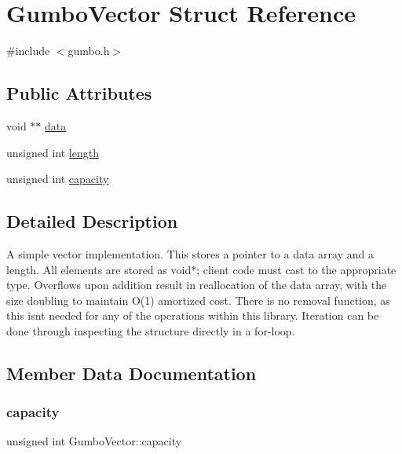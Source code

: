 \hypertarget{struct_gumbo_vector}{}\section{Gumbo\+Vector Struct Reference}
\label{struct_gumbo_vector}


{\ttfamily \#include $<$gumbo.\+h$>$}

\subsection*{Public Attributes}
\begin{DoxyCompactItemize}
\item 
void $\ast$$\ast$ \mbox{\hyperlink{struct_gumbo_vector_a161ea3bf7f915fae8350edded5149a92}{data}}
\item 
unsigned int \mbox{\hyperlink{struct_gumbo_vector_abc3aae0896f142d245cfe29c94dbdf66}{length}}
\item 
unsigned int \mbox{\hyperlink{struct_gumbo_vector_a84033dd4f32fba2013aff52baeba6356}{capacity}}
\end{DoxyCompactItemize}


\subsection{Detailed Description}
A simple vector implementation. This stores a pointer to a data array and a length. All elements are stored as void$\ast$; client code must cast to the appropriate type. Overflows upon addition result in reallocation of the data array, with the size doubling to maintain O(1) amortized cost. There is no removal function, as this isn\textquotesingle{}t needed for any of the operations within this library. Iteration can be done through inspecting the structure directly in a for-\/loop. 

\subsection{Member Data Documentation}
\mbox{\label{struct_gumbo_vector_a84033dd4f32fba2013aff52baeba6356}} 
\subsubsection{\texorpdfstring{capacity}{capacity}}
{\footnotesize\ttfamily unsigned int Gumbo\+Vector\+::capacity}

